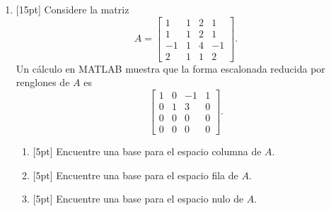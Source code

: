 \documentclass[11pt]{article}
\begin{document}
\begin{enumerate}
\begin{enumerate}
\item{}[6pt] Si $q(x)=2x^3+4\in W$, encontrar el vector de coordenadas de $q(x)$ respecto a la base $\mathcal{B}$.

\vspace{4pt}
\end{enumerate}

\item{}[15pt] Considere la matriz
\[
A = \begin{bmatrix}1&1&2&1\\1&1&2&1\\-1&1&4&-1\\2&1&1&2\end{bmatrix}.
\]
\noindent Un cálculo en MATLAB muestra que la forma escalonada reducida por renglones de $A$ es
\[
\begin{bmatrix}1&0&-1&1\\0&1&3&0\\0&0&0&0\\0&0&0&0\end{bmatrix}.
\]
\begin{enumerate}
\item{}[5pt] Encuentre una base para el espacio columna de $A$.

\vspace{4pt}
\fbox{\begin{minipage}[t][2.2cm]{\dimexpr\linewidth-2\fboxsep-2\fboxrule}
\phantom{x}
\end{minipage}}

\item{}[5pt] Encuentre una base para el espacio fila de $A$.

\vspace{4pt}
\fbox{\begin{minipage}[t][2.2cm]{\dimexpr\linewidth-2\fboxsep-2\fboxrule}
\phantom{x}
\end{minipage}}

\item{}[5pt] Encuentre una base para el espacio nulo de $A$.

\vspace{4pt}
\fbox{\begin{minipage}[t][2.2cm]{\dimexpr\linewidth-2\fboxsep-2\fboxrule}
\phantom{x}
\end{minipage}}
\end{enumerate}
\end{enumerate}
\end{document}
